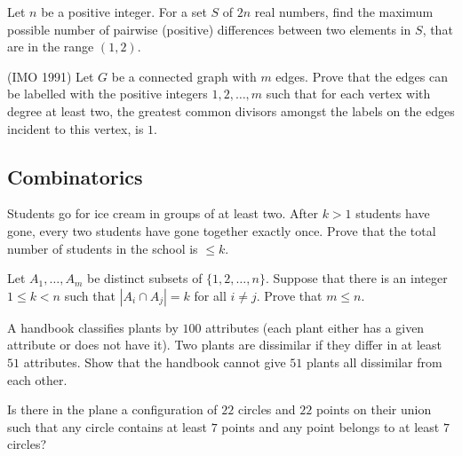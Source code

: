 \documentclass[12pt]{article}
\begin{document}
        \begin{exercise}
        Let $n$ be a positive integer. For a set $S$ of $2n$ real numbers, find the maximum possible number of pairwise (positive) differences between two elements in $S$, that are in the range $(1, 2)$.
        \end{exercise}
        
        \begin{exercise}(IMO 1991)
        Let $G$ be a connected graph with $m$ edges. Prove that the edges can be labelled with the positive integers $1, 2, \ldots, m$ such that for each vertex with degree at least two, the greatest common divisors amongst the labels on the edges incident to this vertex, is $1$.
        \end{exercise}

    \subsection{Combinatorics}

        \begin{exercise}
            Students go for ice cream in groups of at least two. After $k>1$ students have gone, every two students have gone together exactly once. Prove that the total number of students in the school is $\leq k$.
        \end{exercise}

        \begin{exercise}
            Let $A_1,\dots,A_m$ be distinct subsets of $\{1,2,\dots,n\}$. Suppose that there is an integer $1\leq k< n$ such that $|A_i\cap A_j|=k$ for all $i\neq j$. Prove that $m\leq n$.
        \end{exercise}
            
        \begin{exercise}
            A handbook classifies plants by $100$ attributes (each plant either has a given attribute or does not have it). Two plants are dissimilar if they differ in at least $51$ attributes. Show that the handbook cannot give $51$ plants all dissimilar from each other.
        \end{exercise}
            
        \begin{exercise}
            Is there in the plane a configuration of $22$ circles and $22$ points on their union such that any circle contains at least $7$ points and any point belongs to at least $7$ circles?
        \end{exercise}
            
\end{document}
